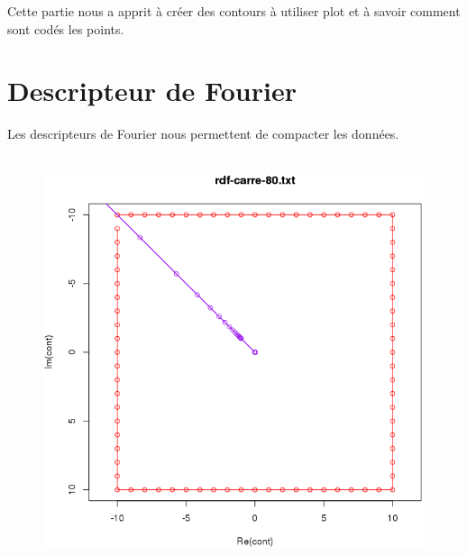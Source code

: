 \documentclass[a4paper,12pt]{report}
\begin{document}
Cette partie nous a apprit à créer des contours à utiliser plot et à savoir comment sont codés les points. 

\newpage 









\section*{Descripteur de Fourier}

Les descripteurs de Fourier nous permettent de compacter les données. 


\begin{figure}[!ht]
	\hbox{ 
     	\hspace*{1cm}
		\includegraphics[scale=0.3]{image/fourier1.png}
     	\hspace*{1cm}
}
\end{figure}
\end{document}

